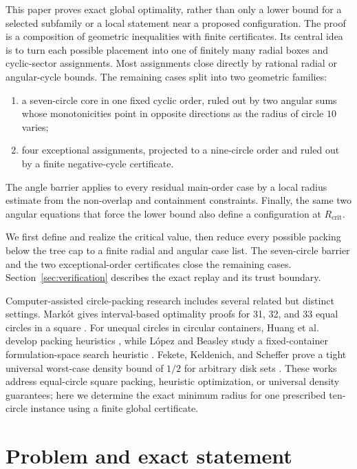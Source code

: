 \documentclass[11pt,a4paper]{article}
\theoremstyle{remark}
\newcommand{\Rcrit}{R_{\mathrm{crit}}}
\begin{document}
This paper proves exact global optimality, rather than only a lower bound for
a selected subfamily or a local statement near a proposed configuration.  The
proof is a composition of geometric inequalities with finite certificates.
Its central idea is to turn each possible placement into one of finitely many
radial boxes and cyclic-sector assignments.  Most assignments close directly
by rational radial or angular-cycle bounds.  The remaining cases split into
two geometric families:
\begin{enumerate}
  \item a seven-circle core in one fixed cyclic order, ruled out by two
        angular sums whose monotonicities point in opposite directions as
        the radius of circle $10$ varies;
  \item four exceptional assignments, projected to a nine-circle order and
        ruled out by a finite negative-cycle certificate.
\end{enumerate}
The angle barrier applies to every residual main-order case by a local
radius estimate from the non-overlap and containment constraints.  Finally,
the same two angular equations that force the lower bound also define a
configuration at $\Rcrit$.

We first define and realize the critical value, then reduce every possible
packing below the tree cap to a finite radial and angular case list.  The
seven-circle barrier and the two exceptional-order certificates close the
remaining cases.  Section~\ref{sec:verification} describes the exact
replay and its trust boundary.

Computer-assisted circle-packing research includes several related but
distinct settings.  Mark\'ot gives interval-based optimality proofs for 31,
32, and 33 equal circles in a square \cite{Markot2021}.  For unequal circles
in circular containers, Huang et al. develop packing heuristics
\cite{Huang2006}, while L\'opez and Beasley study a fixed-container
formulation-space search heuristic \cite{LopezBeasley2016}.  Fekete,
Keldenich, and Scheffer prove a tight universal worst-case density bound of
$1/2$ for arbitrary disk sets \cite{Fekete2023}.  These works address
equal-circle square packing, heuristic optimization, or universal density
guarantees; here we determine the exact minimum radius for one prescribed
ten-circle instance using a finite global certificate.

\section{Problem and exact statement}
\label{sec:global-result}
\end{document}

